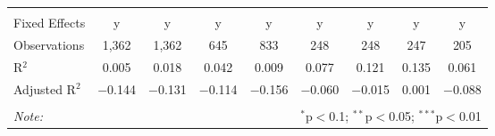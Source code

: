 \begin{table}[!htbp]
\begin{tabular}{@{\extracolsep{5pt}}lcccccccc}
\hline \\[-1.8ex] 
Fixed Effects & y & y & y & y & y & y & y & y \\ 
Observations & 1,362 & 1,362 & 645 & 833 & 248 & 248 & 247 & 205 \\ 
R$^{2}$ & 0.005 & 0.018 & 0.042 & 0.009 & 0.077 & 0.121 & 0.135 & 0.061 \\ 
Adjusted R$^{2}$ & $-$0.144 & $-$0.131 & $-$0.114 & $-$0.156 & $-$0.060 & $-$0.015 & 0.001 & $-$0.088 \\ 
\hline 
\hline \\[-1.8ex] 
\textit{Note:}  & \multicolumn{8}{r}{$^{*}$p$<$0.1; $^{**}$p$<$0.05; $^{***}$p$<$0.01} \\ 
\end{tabular} 
\end{table} 
